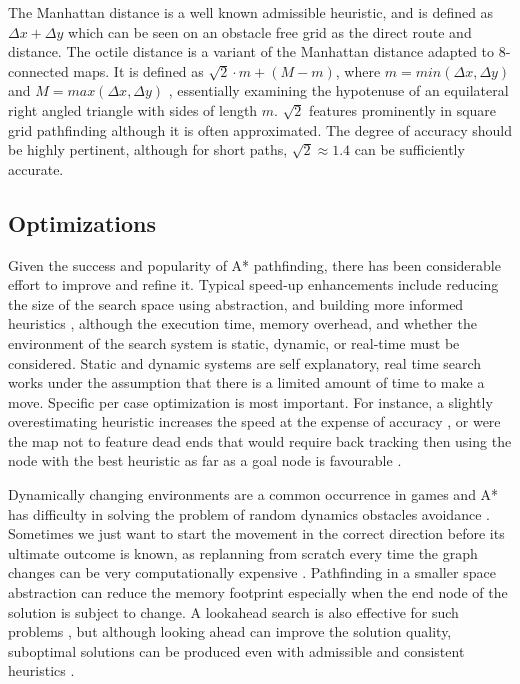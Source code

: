\documentclass{scrartcl}
\begin{document}
The Manhattan distance is a well known admissible heuristic, and is defined as $\Delta x + \Delta y$ \cite{botea2013pathfinding} which can be seen on an obstacle free grid as the direct route and distance.  The octile distance is a variant of the Manhattan distance adapted to 8-connected maps. It is defined as $\sqrt{2} \cdot m + (M - m)$, where $m = min(\Delta x, \Delta y)$ and $M = max(\Delta x, \Delta y)$ \cite{botea2013pathfinding}, essentially examining the hypotenuse of an equilateral right angled triangle with sides of length $m$.  $\sqrt{2}$ features prominently in square grid pathfinding although it is often approximated.  The degree of accuracy should be highly pertinent, although for short paths, $\sqrt{2} \approx 1.4$ can be sufficiently accurate.

\subsection*{Optimizations}

Given the success and popularity of A* pathfinding, there has been considerable effort to improve and refine it.  Typical speed-up enhancements include reducing the size of the search space using abstraction, and building more informed heuristics \cite{harabor2010breaking}, although the execution time, memory overhead, and whether the environment of the search system is static, dynamic, or real-time \cite{hart1968formal} must be considered.  Static and dynamic systems are self explanatory, real time search works under the assumption that there is a limited amount of time to make a move.  Specific per case optimization is most important. For instance, a slightly overestimating heuristic increases the speed at the expense of accuracy \cite{millington2016artificial}, or were the map not to feature dead ends that would require back tracking then using the node with the best heuristic as far as a goal node is favourable \cite{togelius20102009}.

Dynamically changing environments \cite{botea2011ultra} are a common occurrence in games and A* has difficulty in solving the problem of random dynamics obstacles avoidance \cite{wang2012game}.  Sometimes we just want to start the movement in the correct direction before its ultimate outcome is known, as replanning from scratch every time the graph changes can be very computationally expensive \cite{ferguson2005guide}.  Pathfinding in a smaller space abstraction can reduce the memory footprint \cite{lawrence2013database} especially when the end node of the solution is subject to change.  A lookahead search is also effective for such problems \cite{korf1990real}, but although looking ahead can improve the solution quality, suboptimal solutions can be produced even with admissible and consistent heuristics \cite{bulitko2003lookahead}.
\end{document}

